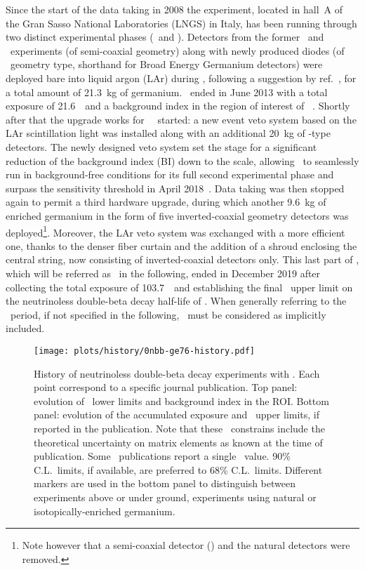 Since the start of the data taking in 2008 the experiment, located in hall~A of the Gran
Sasso National Laboratories (LNGS) in Italy, has been running through two distinct
experimental phases (\phaseone\ and \phasetwo). Detectors from the former \hdm\ and \igex\
experiments (of semi-coaxial geometry) along with newly produced diodes (of \bege\
geometry type, shorthand for Broad Energy Germanium detectors) were deployed bare into
liquid argon (LAr) during \phaseone, following a suggestion by ref.~\cite{Heusser1995},
for a total amount of 21.3~kg of germanium. \phaseone\ ended in June 2013 with a total
exposure of 21.6~\kgyr\ and a background index in the region of interest of
\pIbi~\cite{Agostini2016}.  Shortly after that the upgrade works for \gerda\ \phasetwo\ started:
a new event veto system based on the LAr scintillation light was installed along with an
additional 20~kg of \bege-type detectors.  The newly designed veto system set the stage for a
significant reduction of the background index (BI) down to the \powctsper{-4} scale, allowing
\gerda\ to seamlessly run in background-free conditions for its full second experimental phase
and surpass the \powtenyr{26} sensitivity threshold in April 2018~\cite{Agostini2019a}.
Data taking was then stopped again to permit a third hardware upgrade, during which
another 9.6~kg of enriched germanium in the form of five inverted-coaxial geometry
detectors was deployed\footnote{Note however that a semi-coaxial detector (\ANG{1}) and
the natural \GTF{} detectors were removed.}. Moreover, the LAr veto system was exchanged
with a more efficient one, thanks to the denser fiber curtain and the addition of a shroud
enclosing the central string, now consisting of inverted-coaxial detectors only. This last
part of \phasetwo, which will be referred as \phasetwop\ in the following, ended in
December 2019 after collecting the total exposure of 103.7~\kgyr\ and
establishing the final \gerda\ upper limit on the neutrinoless double-beta decay half-life
of \gerdafinallimit. When generally referring to the \phasetwo\ period, if not specified
in the following, \phasetwop\ must be considered as implicitly included.
\begin{figure}
  \centering
  \texttt{[image: plots/history/0nbb-ge76-history.pdf]}
  \caption[placeholder]{%
    History of neutrinoless double-beta decay experiments with \gesix. Each point
    correspond to a specific journal publication. Top panel: evolution of \thalfzero\
    lower limits and background index in the ROI. Bottom panel: evolution of the
    accumulated exposure and \mbb\ upper limits, if reported in the publication. Note that
    these \mbb\ constrains include the theoretical uncertainty on matrix elements as known
    at the time of publication. Some \hdm\ publications report a single \mbb\ value. 90\%
    C.L.~limits, if available, are preferred to 68\% C.L.~limits. Different markers are
    used in the bottom panel to distinguish between experiments above or under ground,
    experiments using natural or isotopically-enriched germanium\protect\footnotemark.
  }\label{img:exp:ge76-history}
\end{figure}
